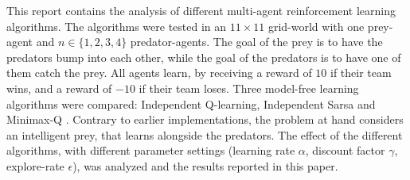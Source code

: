 This report contains the analysis of different multi-agent reinforcement learning algorithms. 
The algorithms were tested in an $11\times11$ grid-world with one prey-agent and $n\in \{1,2,3,4\}$ predator-agents. The goal of the prey is to have the predators bump into each other, while the goal of the predators is to have one of them catch the prey. All agents learn, by receiving a reward of $10$ if their team wins, and a reward of $-10$ if their team loses. 
Three model-free learning algorithms were compared: Independent Q-learning, Independent Sarsa and Minimax-Q \cite{Littman94markovgames}. Contrary to earlier implementations, the problem at hand considers an intelligent prey, that learns alongside the predators. The effect of the different algorithms, with different parameter settings (learning rate $\alpha$, discount factor $\gamma$, explore-rate $\epsilon$), was analyzed and the results reported in this paper.